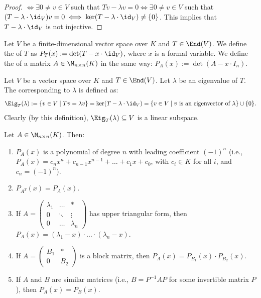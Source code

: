 \begin{proof}
  $\iff \exists 0 \ne v \in V$ such that $Tv - \lambda v = 0 \iff \exists 0 \ne v \in V$ such that $(T - \lambda \cdot \id_V)v = 0 \iff \ker(T - \lambda \cdot \id_V) \ne \{0\}$.
  This implies that $T - \lambda \cdot \id_V$ is not injective.
\end{proof}
\begin{definition}\label{def:char_poly}
  Let $V$ be a finite-di\-men\-sional vector space over $K$ and $T \in \End(V)$. We define the  of $T$ as $P_T(x) := \det(T - x \cdot \id_V)$, where $x$ is a formal variable. We define the  of a matrix $A \in \M_{n \times n}(K)$ in the same way: $P_A(x) := \det(A - x \cdot I_n)$.
\end{definition}

\begin{definition}[Eigenspace]\label{def:eigenspace}
  Let $V$ be a vector space over $K$ and $T \in \End(V)$. Let $\lambda$ be an eigenvalue of $T$. The  corresponding to $\lambda$ is defined as:
  \[ \Eig_T(\lambda) := \{v \in V \mid Tv = \lambda v\} = \ker(T - \lambda \cdot \id_V) = \{v \in V \mid v \text{ is an eigenvector of } \lambda\} \cup \{0\}. \]
  Clearly (by this definition), $\Eig_T(\lambda) \subseteq V$ is a linear subspace.
\end{definition}

\begin{lemma}\label{lem:properties_char_poly}
  Let $A \in \M_{n \times n}(K)$. Then:
  \begin{enumerate}
    \item[\textbf{(a)}] $P_A(x)$ is a polynomial of degree $n$ with leading coefficient $(-1)^n$ (i.e., $P_A(x) = c_n x^n + c_{n-1} x^{n-1} + \dots + c_1 x + c_0$, with $c_i \in K$ for all $i$, and $c_n = (-1)^n$).
    \item[\textbf{(b)}] $P_{A^T}(x) = P_A(x)$.
    \item[\textbf{(c)}] If $A = \begin{pmatrix} \lambda_1 & \dots & * \\ 0 & \ddots & \vdots \\ 0 & \dots & \lambda_n \end{pmatrix}$ has upper triangular form, then $P_A(x) = (\lambda_1 - x) \cdot \dots \cdot (\lambda_n - x)$.
    \item[\textbf{(d)}] If $A = \left(\begin{array}{c|c} B_1 & * \\ \hline 0 & B_2 \end{array}\right)$ is a block matrix, then $P_A(x) = P_{B_1}(x) \cdot P_{B_2}(x)$.
    \item[\textbf{(e)}] If $A$ and $B$ are similar matrices (i.e., $B = P^{-1}AP$ for some invertible matrix $P$), then $P_A(x) = P_B(x)$.
  \end{enumerate}
\end{lemma}

